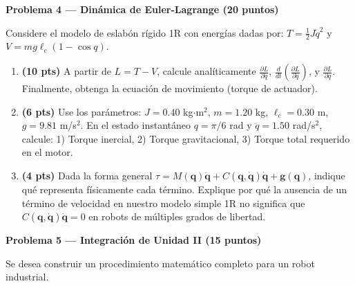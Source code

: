 \documentclass[11pt, a4paper]{article}
\begin{document}
\noindent\textbf{\large Problema 4 — Dinámica de Euler-Lagrange (20 puntos)}

Considere el modelo de eslabón rígido 1R con energías dadas por: $T = \frac{1}{2}J\dot{q}^2$ y $V = mg\ell_c(1 - \cos q)$.

\begin{enumerate}[label=\textbf{\alph*)}]
    \item \textbf{(10 pts)} A partir de $L = T - V$, calcule analíticamente $\frac{\partial L}{\partial \dot{q}}$, $\frac{d}{dt}\left(\frac{\partial L}{\partial \dot{q}}\right)$, y $\frac{\partial L}{\partial q}$. Finalmente, obtenga la ecuación de movimiento (torque de actuador).
    \item \textbf{(6 pts)} Use los parámetros: $J = 0.40$ kg$\cdot$m$^2$, $m = 1.20$ kg, $\ell_c = 0.30$ m, $g = 9.81$ m/s$^2$. En el estado instantáneo $q = \pi/6$ rad y $\ddot{q} = 1.50$ rad/s$^2$, calcule: 1) Torque inercial, 2) Torque gravitacional, 3) Torque total requerido en el motor.
    \item \textbf{(4 pts)} Dada la forma general $\tau = M(\mathbf{q})\ddot{\mathbf{q}} + C(\mathbf{q}, \dot{\mathbf{q}})\dot{\mathbf{q}} + \mathbf{g}(\mathbf{q})$, indique qué representa físicamente cada término. Explique por qué la ausencia de un término de velocidad en nuestro modelo simple 1R no significa que $C(\mathbf{q}, \dot{\mathbf{q}})\dot{\mathbf{q}} = 0$ en robots de múltiples grados de libertad.
\end{enumerate}

\noindent\textbf{\large Problema 5 — Integración de Unidad II (15 puntos)}

Se desea construir un procedimiento matemático completo para un robot industrial.
\end{document}
